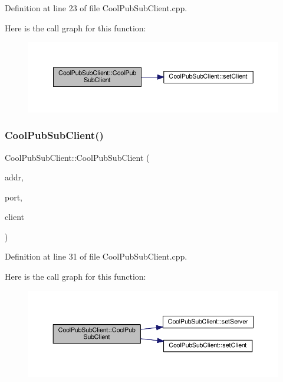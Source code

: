 Definition at line 23 of file Cool\+Pub\+Sub\+Client.\+cpp.

Here is the call graph for this function\+:
\nopagebreak
\begin{figure}[H]
\begin{center}
\leavevmode
\includegraphics[width=350pt]{class_cool_pub_sub_client_a0563a12cb4e9339bf2605cfc655e717d_cgraph}
\end{center}
\end{figure}
\mbox{\label{class_cool_pub_sub_client_a4548ad6f306f6181e337a86c0b21a89a}} 
\subsubsection{\texorpdfstring{Cool\+Pub\+Sub\+Client()}{CoolPubSubClient()}\hspace{0.1cm}{\footnotesize\ttfamily [3/14]}}
{\footnotesize\ttfamily Cool\+Pub\+Sub\+Client\+::\+Cool\+Pub\+Sub\+Client (\begin{DoxyParamCaption}\item[{I\+P\+Address}]{addr,  }\item[{uint16\+\_\+t}]{port,  }\item[{Client \&}]{client }\end{DoxyParamCaption})}



Definition at line 31 of file Cool\+Pub\+Sub\+Client.\+cpp.

Here is the call graph for this function\+:
\nopagebreak
\begin{figure}[H]
\begin{center}
\leavevmode
\includegraphics[width=350pt]{class_cool_pub_sub_client_a4548ad6f306f6181e337a86c0b21a89a_cgraph}
\end{center}
\end{figure}
\mbox{\label{class_cool_pub_sub_client_af8b1aeb169366da52e3289bb6c238b6b}} 
